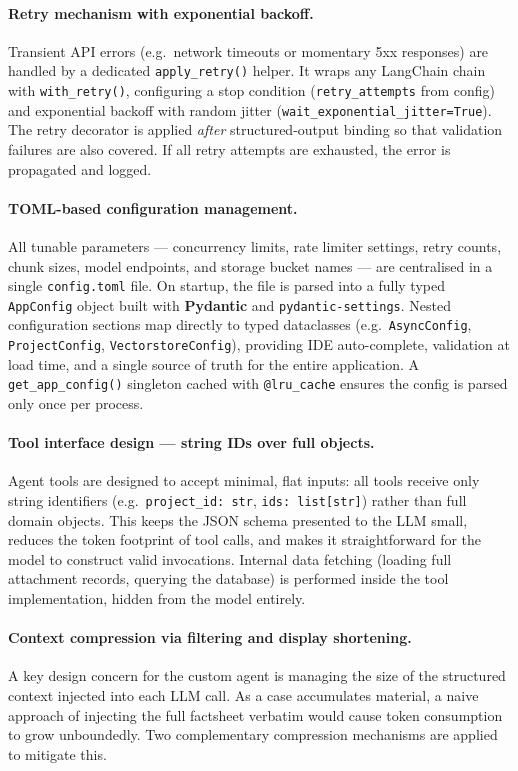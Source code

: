 \paragraph{Retry mechanism with exponential backoff.}
Transient API errors (e.g.\ network timeouts or momentary 5xx responses) are handled by a dedicated \texttt{apply\_retry()} helper. It wraps any LangChain chain with \texttt{with\_retry()}, configuring a stop condition (\texttt{retry\_attempts} from config) and exponential backoff with random jitter (\texttt{wait\_exponential\_jitter=True}). The retry decorator is applied \emph{after} structured-output binding so that validation failures are also covered. If all retry attempts are exhausted, the error is propagated and logged.

\paragraph{TOML-based configuration management.}
All tunable parameters — concurrency limits, rate limiter settings, retry counts, chunk sizes, model endpoints, and storage bucket names — are centralised in a single \texttt{config.toml} file. On startup, the file is parsed into a fully typed \texttt{AppConfig} object built with \textbf{Pydantic} and \texttt{pydantic-settings}. Nested configuration sections map directly to typed dataclasses (e.g.\ \texttt{AsyncConfig}, \texttt{ProjectConfig}, \texttt{VectorstoreConfig}), providing IDE auto-complete, validation at load time, and a single source of truth for the entire application. A \texttt{get\_app\_config()} singleton cached with \texttt{@lru\_cache} ensures the config is parsed only once per process.

\paragraph{Tool interface design — string IDs over full objects.}
Agent tools are designed to accept minimal, flat inputs: all tools receive only string identifiers (e.g.\ \texttt{project\_id: str}, \texttt{ids: list[str]}) rather than full domain objects. This keeps the JSON schema presented to the LLM small, reduces the token footprint of tool calls, and makes it straightforward for the model to construct valid invocations. Internal data fetching (loading full attachment records, querying the database) is performed inside the tool implementation, hidden from the model entirely.

\paragraph{Context compression via filtering and display shortening.}
A key design concern for the custom agent is managing the size of the structured context injected into each LLM call. As a case accumulates material, a naive approach of injecting the full factsheet verbatim would cause token consumption to grow unboundedly. Two complementary compression mechanisms are applied to mitigate this.

